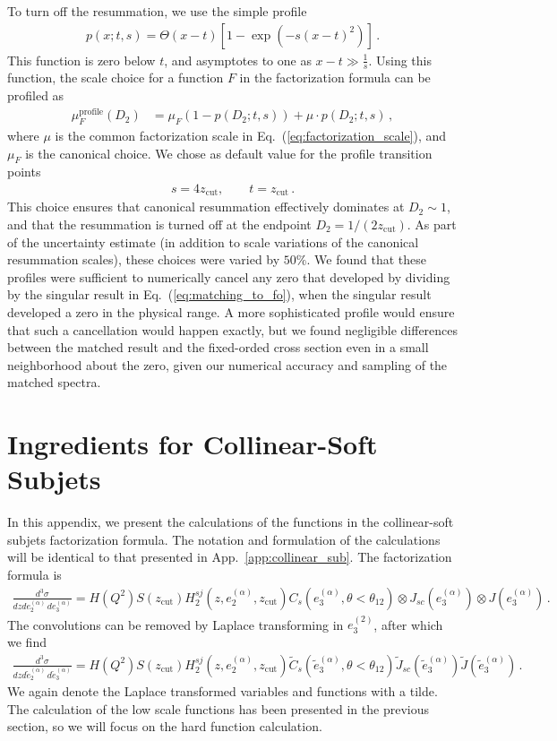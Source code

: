 \documentclass[a4paper,11pt]{article}
\newcommand{\ecf}[2]{e_{#1}^{(#2)}}
\newcommand{\ecflp}[2]{\tilde e_{#1}^{(#2)}}
\def\zcut{z_{\text{cut}}}
\DeclareRobustCommand{\App}[1]{App.~\ref{#1}}
\DeclareRobustCommand{\Eq}[1]{Eq.~(\ref{#1})}
\begin{document}
To turn off the resummation, we use the simple profile
\begin{align}
p(x;t,s)=\Theta(x-t)\left[1-\exp\left(-s(x-t)^2\right)\right]\,.
\end{align}
This function is zero below $t$, and asymptotes to one as $x-t\gg\frac{1}{s}$. Using this function, the scale choice for a function $F$ in the factorization formula can be profiled as
\begin{align}
\mu_F^{\text{profile}}(D_2)&=\mu_F\left(1-p(D_2;t,s)\right)+\mu\cdot p(D_2;t,s)\,,
\end{align}
where $\mu$ is the common factorization scale in \Eq{eq:factorization_scale}, and $\mu_F$ is the canonical choice. We chose as default value for the profile transition points
\begin{align}
s=4\zcut,\qquad t=\zcut\,.
\end{align}
This choice ensures that canonical resummation effectively dominates at $D_2\sim 1$, and that the resummation is turned off at the endpoint $D_2=1/(2\zcut)$. As part of the uncertainty estimate (in addition to scale variations of the canonical resummation scales), these choices were varied by $50\%$. We found that these profiles were sufficient to numerically cancel any zero that developed by dividing by the singular result in \Eq{eq:matching_to_fo}, when the singular result developed a zero in the physical range. A more sophisticated profile would ensure that such a cancellation would happen exactly, but we found negligible differences between the matched result and the fixed-orded cross section even in a small neighborhood about the zero, given our numerical accuracy and sampling of the matched spectra.


\section{Ingredients for Collinear-Soft Subjets}\label{app:csoft_sub}


In this appendix, we present the calculations of the functions in the collinear-soft subjets factorization formula.  The notation and formulation of the calculations will be identical to that presented in \App{app:collinear_sub}.  The factorization formula is
\begin{align}
\frac{d^3\sigma}{dz d\ecf{2}{\alpha} \, d\ecf{3}{\alpha}}= H(Q^2) S(\zcut) H_2^{sj}(z, \ecf{2}{\alpha},\zcut)  C_s(\ecf{3}{\alpha},\theta<\theta_{12}) \otimes J_{sc}(\ecf{3}{\alpha})\otimes J(\ecf{3}{\alpha}) \,.
\end{align}
The convolutions can be removed by Laplace transforming in $\ecf{3}{2}$, after which we find
\begin{align}
\frac{d^3\sigma}{dz d\ecflp{2}{\alpha} \, d\ecflp{3}{\alpha}}= H(Q^2) S(\zcut) H_2^{sj}(z, \ecf{2}{\alpha},\zcut)  \tilde C_s(\ecflp{3}{\alpha},\theta<\theta_{12}) \tilde J_{sc}(\ecflp{3}{\alpha})\tilde J(\ecflp{3}{\alpha}) \,.
\end{align}
We again denote the Laplace transformed variables and functions with a tilde.
The calculation of the low scale functions has been presented in the previous section, so we will focus on the hard function calculation.
\end{document}
